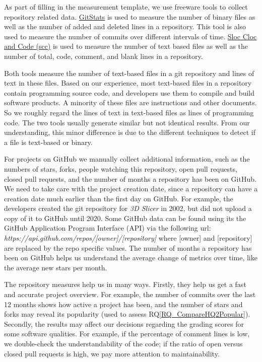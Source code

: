 \documentclass[final, 3p, times, authoryear]{elsarticle}
\newcommand{\rqref}[1]{RQ\ref{#1}}
\begin{document}
As part of filling in the measurement template, we use freeware tools to collect
repository related data. \href{https://github.com/tomgi/git_stats}{GitStats}
\citep{Gieniusz2019} is used to measure the number of binary files as well as
the number of added and deleted lines in a repository. This tool is also used to
measure the number of commits over different intervals of time.
\href{https://github.com/boyter/scc}{Sloc Cloc and Code (scc)}
\citep{Boyter2021} is used to measure the number of text based files as well as
the number of total, code, comment, and blank lines in a repository.

Both tools measure the number of text-based files in a git repository and lines
of text in these files. Based on our experience, most text-based files in a
repository contain programming source code, and developers use them to compile
and build software products. A minority of these files are instructions and
other documents. So we roughly regard the lines of text in text-based files as
lines of programming code. The two tools usually generate similar but not
identical results. From our understanding, this minor difference is due to the
different techniques to detect if a file is text-based or binary.

For projects on GitHub we manually collect additional information, such as the
numbers of stars, forks, people watching this repository, open pull requests,
closed pull requests, and the number of months a repository has been on GitHub.
We need to take care with the project creation date, since a repository can have
a creation date much earlier than the first day on GitHub.  For example, the
developers created the git repository for \textit{3D Slicer} in 2002, but did
not upload a copy of it to GitHub until 2020. Some GitHub data can be found
using its the GitHub Application Program Interface (API) via the following url:
\textit{https://api.github.com/repos/[owner]/[repository]} where [owner] and
[repository] are replaced by the repo specific values. The number of months a
repository has been on GitHub helps us understand the average change of metrics
over time, like the average new stars per month. 

The repository measures help us in many ways. Firstly, they help us get a fast
and accurate project overview. For example, the number of commits over the last
12 months shows how active a project has been, and the number of stars and forks
may reveal its popularity (used to assess \rqref{RQ_CompareHQ2Popular}).
Secondly, the results may affect our decisions regarding the grading scores for
some software qualities. For example, if the percentage of comment lines is low,
we double-check the understandability of the code; if the ratio of open versus
closed pull requests is high, we pay more attention to maintainability.
\end{document}
